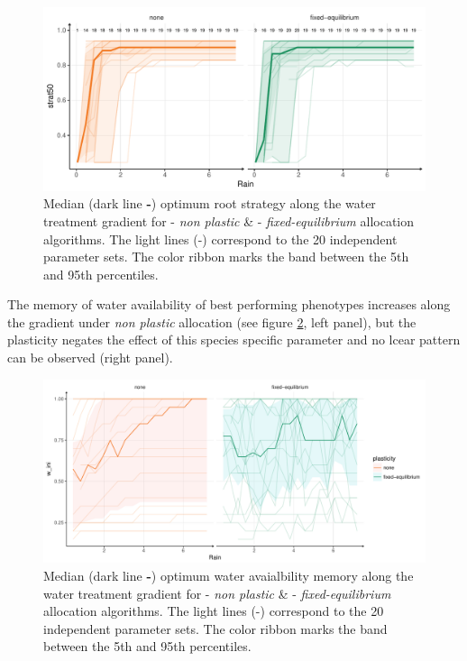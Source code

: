 \begin{figure}\label{fig:gradient_strat_trend}
\includegraphics[width = \textwidth]{./2_PP/Figures/Rain/gradient_strat_trend.pdf}
\caption{Median (dark line \textbf{-}) optimum root strategy along the water treatment gradient for \textcolor{myOrange}{- \textit{non plastic}} \&  \textcolor{myGreen}{- \textit{fixed-equilibrium}} allocation algorithms. The light lines (-) correspond to the 20 independent parameter sets. The color ribbon marks the band between the 5th and 95th percentiles.} %
\end{figure}

The memory of water availability of best performing phenotypes increases along the gradient under \textit{non plastic} allocation (see figure \ref{fig:gradient_w_ini_trend}, left panel), but the plasticity negates the effect of this species specific parameter and no lcear pattern can be observed (right panel).


\begin{figure}\label{fig:gradient_w_ini_trend}
\includegraphics[width = \textwidth]{./2_PP/Figures/Rain/best_w_ini_pl_rain_grad_alt.pdf}
\caption{Median (dark line \textbf{-}) optimum water avaialbility memory along the water treatment gradient for \textcolor{myOrange}{- \textit{non plastic}} \&  \textcolor{myGreen}{- \textit{fixed-equilibrium}} allocation algorithms. The light lines (-) correspond to the 20 independent parameter sets. The color ribbon marks the band between the 5th and 95th percentiles.} %
\end{figure}


